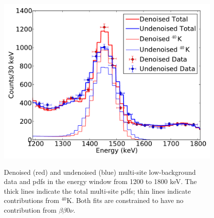 \begin{figure}
\begin{center}
\includegraphics[keepaspectratio=true,width=\textwidth]{DenoisedVsUndenoised_TotalPdfsWithData_k40range_MS.pdf}
\end{center}
\renewcommand{\baselinestretch}{1}
\small\normalsize
\begin{quote}
\caption{Denoised (red) and undenoised (blue) multi-site low-background data and pdfs in the energy window from 1200 to 1800 keV.  The thick lines indicate the total multi-site pdfs; thin lines indicate contributions from $^{40}$K.  Both fits are constrained to have no contribution from $\beta\beta 0\nu$.}
\label{fig:DenoisedComparison_K40MS}
\end{quote}
\end{figure}
\renewcommand{\baselinestretch}{2}
\small\normalsize

